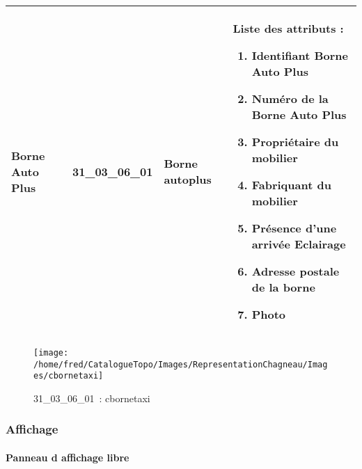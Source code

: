 \documentclass[12pt,titlepage]{book}
\begin{document}
\renewcommand{\arraystretch}{1.2}
\begin{supertabular}{|p{10cm}|c|p{13cm}|p{12cm}|}
 Borne Auto Plus & 31\_03\_06\_01 & Borne autoplus & Liste des attributs :
\begin{enumerate}
  \item Identifiant Borne Auto Plus  \item Numéro de la Borne Auto Plus  \item Propriétaire du mobilier  \item Fabriquant du mobilier  \item Présence d'une arrivée Eclairage  \item Adresse postale de la borne  \item Photo\end{enumerate}
\\
\hline
\end{supertabular}
\begin{figure}[h!]
  \hfill         %
  \begin{minipage}[t]{3cm}
    \begin{center}
      \texttt{[image: /home/fred/CatalogueTopo/Images/RepresentationChagneau/Images/cbornetaxi]}
      \caption[~31\_03\_06\_01]{\small{31\_03\_06\_01~:} \tiny{cbornetaxi}}\label{cbornetaxi}
    \end{center}
  \end{minipage}
\end{figure}

\subsubsection{\large Affichage}
\paragraph{Panneau d affichage libre}
\noindent
\vspace{\baselineskip}
\end{document}
